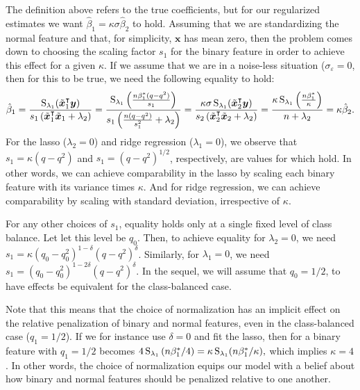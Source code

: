 The definition above refers to the true coefficients, but for our regularized estimates we
want \(\hat{\beta}_1 = \kappa\sigma\hat{\beta}_2\) to hold. Assuming that we are
standardizing the normal feature and that, for simplicity, \(\bm{x}\) has mean zero, then
the problem comes down to choosing the scaling factor \(s_1\) for the binary feature in
order to achieve this effect for a given \(\kappa\). If we assume that we are in a
noise-less situation (\(\sigma_\varepsilon = 0\), then for this to be true, we need the
following equality to hold:
%
\begin{equation}
  \label{eq:comparable-effects}
  \hat{\beta}_1 = \frac{\operatorname{S}_{\lambda_1}(\tilde{\boldsymbol{x}}_1^\intercal \boldsymbol{y})}{s_1\left(\tilde{\boldsymbol{x}}_1^\intercal \tilde{\boldsymbol{x}}_1 + \lambda_2\right)}
  = \frac{\operatorname{S}_{\lambda_1}\left(\frac{n\beta_1^* (q - q^2)}{s_1}\right)}{s_1\left(\frac{n(q - q^2)}{s_1^2} + \lambda_2\right)}
  = \frac{\kappa\sigma \operatorname{S}_{\lambda_1}(\tilde{\boldsymbol{x}}_2^\intercal \boldsymbol{y})}{s_2\left(\tilde{\boldsymbol{x}}_2^\intercal \tilde{\boldsymbol{x}}_2 + \lambda_2\right)}
  = \frac{\kappa \operatorname{S}_{\lambda_1}\left(\frac{n\beta_1^*}{\kappa} \right)}{n + \lambda_2}
  = \kappa \hat{\beta}_2.
\end{equation}
%
For the lasso (\(\lambda_2 = 0\)) and ridge regression (\(\lambda_1=0\)), we observe that
\(s_1 = \kappa (q - q^2)\) and \(s_1 = (q - q^2)^{1/2}\), respectively, are values for
which  hold. In other words, we can achieve comparability in
the lasso by scaling each binary feature with its variance times \(\kappa\). And for ridge
regression, we can achieve comparability by scaling with standard deviation, irrespective
of \(\kappa\).

For any other choices of \(s_1\), equality holds only at a single fixed level of class
balance. Let let this level be \(q_0\). Then, to achieve equality for \(\lambda_2 = 0\), we
need \(s_1 =\kappa (q_0 - q_0^2)^{1 - \delta}(q - q^2)^\delta\). Similarly, for \(\lambda_1
= 0\), we need \(s_1 = (q_0 - q_0^2)^{1 - 2\delta} (q - q^2)^\delta\). In the sequel, we
will assume that \(q_0 = 1/2\), to have effects be equivalent for the class-balanced case.

Note that this means that the choice of normalization has an implicit effect on the
relative penalization of binary and normal features, even in the class-balanced case (\(q_1
= 1/2\)). If we for instance use \(\delta=0\) and fit the lasso, then
 for a binary feature with \(q_1=1/2\) becomes
\(4\operatorname{S}_{\lambda_1}\left(n\beta_1^*/4\right) = \kappa \operatorname{S}_{\lambda_1}(n\beta_1^*/\kappa ),\)
which implies \(\kappa = 4\). In other words, the choice of normalization equips our model
with a belief about how binary and normal features should be penalized relative to one
another.

